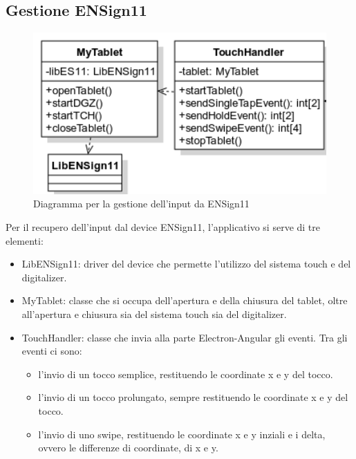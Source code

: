 \subsection{Gestione ENSign11}
\begin{figure}[h]
    \centering
    \includegraphics[width=340pt]{ProgettazioneTecnica/ENS11.png}
    \caption{Diagramma per la gestione dell'input da ENSign11}
    \label{fig:es11}
\end{figure}
Per il recupero dell'input dal device ENSign11, l'applicativo si serve di tre elementi:
\begin{itemize}
    \item LibENSign11: driver del device che permette l'utilizzo del sistema touch e del digitalizer.
    \item MyTablet: classe che si occupa dell'apertura e della chiusura del tablet, oltre all'apertura e chiusura sia del sistema touch sia del digitalizer.
    \item TouchHandler: classe che invia alla parte Electron-Angular gli eventi. Tra gli eventi ci sono: \begin{itemize}
        \item l'invio di un tocco semplice, restituendo le coordinate x e y del tocco.
        \item l'invio di un tocco prolungato, sempre restituendo le coordinate x e y del tocco.
        \item l'invio di uno swipe, restituendo le coordinate x e y inziali e i delta, ovvero le differenze di coordinate, di x e y. 
    \end{itemize}
\end{itemize}